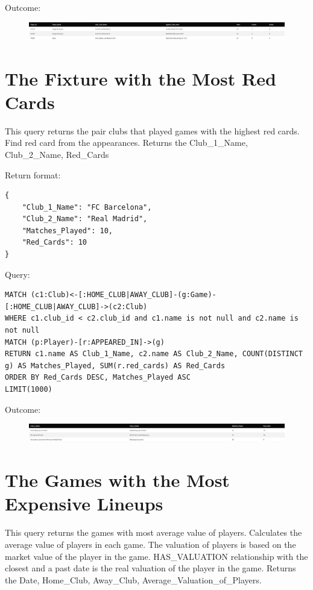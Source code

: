 \documentclass{Configuration_Files/PoliMi3i_thesis}
\begin{document}
Outcome:
\begin{figure}[H]
    \centering
    \includegraphics[width=\linewidth]{Project Template/Images/query_output/q5.png}
\end{figure}











\section{The Fixture with the Most Red Cards}
This query returns the pair clubs that played games with the highest red cards. Find red card from the appearances.
Returns the Club\_1\_Name, Club\_2\_Name, Red\_Cards

Return format:
\begin{lstlisting}[style=json]
{
    "Club_1_Name": "FC Barcelona",
    "Club_2_Name": "Real Madrid",
    "Matches_Played": 10,
    "Red_Cards": 10
}
\end{lstlisting}


Query:

\begin{lstlisting}[language=Cypher]
MATCH (c1:Club)<-[:HOME_CLUB|AWAY_CLUB]-(g:Game)-[:HOME_CLUB|AWAY_CLUB]->(c2:Club)
WHERE c1.club_id < c2.club_id and c1.name is not null and c2.name is not null
MATCH (p:Player)-[r:APPEARED_IN]->(g)
RETURN c1.name AS Club_1_Name, c2.name AS Club_2_Name, COUNT(DISTINCT g) AS Matches_Played, SUM(r.red_cards) AS Red_Cards
ORDER BY Red_Cards DESC, Matches_Played ASC
LIMIT(1000)
\end{lstlisting}


Outcome:
\begin{figure}[H]
    \centering
    \includegraphics[width=\linewidth]{Project Template/Images/query_output/q6.png}
\end{figure}






\section{The Games with the Most Expensive Lineups}
This query returns the games with most average value of players. Calculates the average value of players in each game. The valuation of players is based on the market value of the player in the game. HAS\_VALUATION relationship with the closest and a past date is the real valuation of the player in the game.
Returns the Date, Home\_Club, Away\_Club, Average\_Valuation\_of\_Players.
\end{document}
